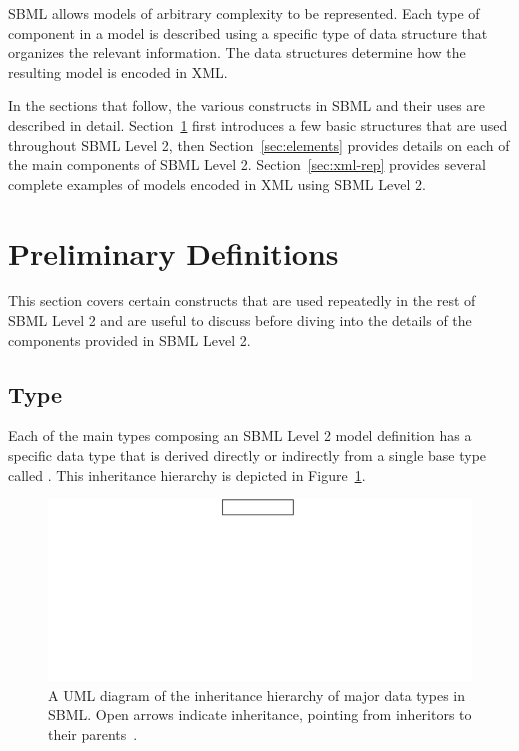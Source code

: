 \documentclass[10pt]{cekarticle}
\newcommand{\vref}[1]{\ref{#1}}
\begin{document}
SBML allows models of arbitrary complexity to be represented.  Each type of
component in a model is described using a specific type of data structure
that organizes the relevant information.  The data structures determine how
the resulting model is encoded in XML.

In the sections that follow, the various constructs in SBML and
their uses are described in detail.  Section~\ref{sec:general}
first introduces a few basic structures that are used throughout
SBML Level 2, then Section~\ref{sec:elements} provides details on
each of the main components of SBML Level 2.
Section~\ref{sec:xml-rep} provides several complete examples of
models encoded in XML using SBML Level 2.

\section{Preliminary Definitions}
\label{sec:general}

This section covers certain constructs that are used repeatedly in
the rest of SBML Level 2 and are useful to discuss before diving
into the details of the components provided in SBML Level 2.

\subsection{Type }
\label{sec:sbase}

Each of the main types composing an SBML Level 2 model definition
has a specific data type that is derived directly or indirectly
from a single base type called .  This inheritance
hierarchy is depicted in Figure~\vref{fig:top-level}.

\begin{figure}[h]
  \vspace*{8pt}
  \centering
  \includegraphics[scale = 0.7]{top-level}
  \caption{A UML diagram of the inheritance hierarchy of major data types
    in SBML.  Open arrows indicate inheritance, pointing from inheritors to
    their parents~\citep{eriksson:1998,oestereich:1999}.}
  \label{fig:top-level}
\end{figure}
\end{document}
